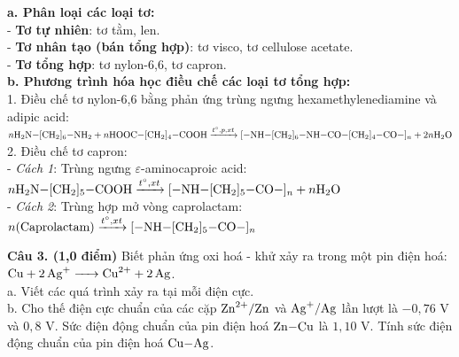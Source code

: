 \documentclass[11pt,a4paper]{article}
\begin{document}
\begin{tcolorbox}[colback=tableGreen!30,colframe=mainGreen!70,title=\textbf{Hướng dẫn giải chi tiết Câu 2},fonttitle=\bfseries]
\textbf{a. Phân loại các loại tơ:}\\
- \textbf{Tơ tự nhiên}: tơ tằm, len.\\
- \textbf{Tơ nhân tạo (bán tổng hợp)}: tơ visco, tơ cellulose acetate.\\
- \textbf{Tơ tổng hợp}: tơ nylon-6,6, tơ capron.\\[4pt]
\textbf{b. Phương trình hóa học điều chế các loại tơ tổng hợp:}\\
1. Điều chế tơ nylon-6,6 bằng phản ứng trùng ngưng hexamethylenediamine và adipic acid:\\
$n\ce{H2N-[CH2]6-NH2} + n\ce{HOOC-[CH2]4-COOH} \xrightarrow{t^\circ, p, xt} \ce{[-NH-[CH2]6-NH-CO-[CH2]4-CO-]_n} + 2n\ce{H2O}$\\
2. Điều chế tơ capron:\\
- \textit{Cách 1}: Trùng ngưng $\varepsilon$-aminocaproic acid:\\
$n\ce{H2N-[CH2]5-COOH} \xrightarrow{t^\circ, xt} \ce{[-NH-[CH2]5-CO-]_n} + n\ce{H2O}$\\
- \textit{Cách 2}: Trùng hợp mở vòng caprolactam:\\
$n(\text{Caprolactam}) \xrightarrow{t^\circ, xt} \ce{[-NH-[CH2]5-CO-]_n}$
\end{tcolorbox}

\vspace{4pt}
\noindent
\textbf{Câu 3. (1,0 điểm)} Biết phản ứng oxi hoá - khử xảy ra trong một pin điện hoá: $\ce{Cu + 2Ag+ -> Cu^2+ + 2Ag}$.\\
a. Viết các quá trình xảy ra tại mỗi điện cực.\\
b. Cho thế điện cực chuẩn của các cặp $\ce{Zn^2+/Zn}$ và $\ce{Ag+/Ag}$ lần lượt là $-0,76\text{ V}$ và $0,8\text{ V}$. Sức điện động chuẩn của pin điện hoá $\ce{Zn-Cu}$ là $1,10\text{ V}$. Tính sức điện động chuẩn của pin điện hoá $\ce{Cu-Ag}$.
\end{document}
